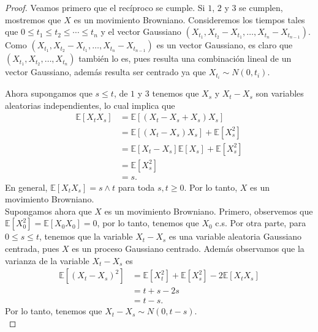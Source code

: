 \begin{proof}
Veamos primero que el recíproco se cumple. Si $1$, $2$ y $3$ se cumplen, mostremos que $X$ es un movimiento Browniano. Consideremos los tiempos tales que $0 \leq t_1 \leq t_2 \leq \cdots \leq t_n$ y el vector Gaussiano $(X_{t_1}, X_{t_2} - X_{t_1}, \ldots, X_{t_n} - X_{t_{n-1}})$. \\

Como $(X_{t_1}, X_{t_2} - X_{t_1}, \ldots, X_{t_n} - X_{t_{n-1}})$ es un vector Gaussiano, es claro que $(X_{t_1}, X_{t_2}, \ldots, X_{t_n})$ también lo es, pues resulta una combinación lineal de un vector Gaussiano, además resulta ser centrado ya que $X_{t_i} \sim N(0, t_i)$.

Ahora supongamos que $s \leq t$, de $1$ y $3$ tenemos que $X_s$ y $X_t - X_s$ son variables aleatorias independientes, lo cual implica que
  \begin{align*}
  	\mathbb{E}[X_t X_s] &= \mathbb{E}[(X_t - X_s + X_s) X_s] \\
    &= \mathbb{E}[(X_t - X_s) X_s] + \mathbb{E}[X_s^2] \\
    &= \mathbb{E}[X_t - X_s] \mathbb{E}[X_s] + \mathbb{E}[X_s^2] \\
    &= \mathbb{E}[X_s^2] \\
    & = s.
  \end{align*}
En general, $\mathbb{E}[X_t X_s] = s \wedge t$ para toda $s, t \geq 0$. Por lo tanto, $X$ es un movimiento Browniano. \\

Supongamos ahora que $X$ es un movimiento Browniano. Primero, observemos que $\mathbb{E} [X_0^2] = \mathbb{E} [X_0 X_0] = 0$, por lo tanto, tenemos que $X_0$ c.s. Por otra parte, para $0 \leq s \leq t$, tenemos que la variable $X_t - X_s$ es una variable aleatoria Gaussiano centrada, pues $X$ es un proceso Gaussiano centrado. Además observamos que la varianza de la variable $X_t - X_s$ es
  \begin{align*}
  	\mathbb{E} [(X_t - X_s)^2] &= \mathbb{E} [X_t^2] + \mathbb{E} [X_s^2] - 2 \mathbb{E} [X_t X_s] \\
    & = t + s - 2 s \\
    &= t - s.
  \end{align*}
Por lo tanto, tenemos que $X_t - X_s \sim N(0, t - s)$. \\


\end{proof}
